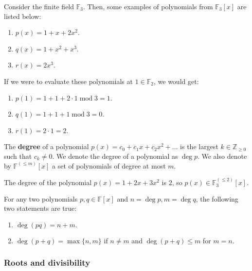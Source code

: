 \documentclass[../lecture-notes.tex]{subfiles}
\begin{document}
\begin{example}
    Consider the finite field $\mathbb{F}_3$. Then, some examples of polynomials from $\mathbb{F}_3[x]$ are listed below:
    \begin{enumerate}
        \item $p(x) = 1 + x + 2x^2$.
        \item $q(x) = 1 + x^2 + x^3$.
        \item $r(x) = 2x^3$.
    \end{enumerate}

   If we were to evaluate these polynomials at $1 \in \mathbb{F}_2$, we would get:
    \begin{enumerate}
        \item $p(1) = 1 + 1 + 2 \cdot 1 \; \text{mod} \; 3 = 1$.
        \item $q(1) = 1 + 1 + 1 \; \text{mod} \; 3 = 0$.
        \item $r(1) = 2 \cdot 1 = 2$.
    \end{enumerate}
\end{example}

\begin{definition}
    The \textbf{degree} of a polynomial $p(x) = c_0+c_1x+c_2x^2+\dots$ is the largest $k \in \mathbb{Z}_{\geq 0}$ such that $c_k \neq 0$. We denote the degree of a polynomial as $\deg p$. We also denote by $\mathbb{F}^{(\leq m)}[x]$ a set of polynomials of degree at most $m$.
\end{definition}

\begin{example}
    The degree of the polynomial $p(x) = 1 + 2x + 3x^2$ is $2$, so $p(x) \in \mathbb{F}_3^{(\leq 2)}[x]$.
\end{example}

\begin{theorem}
    For any two polynomials $p,q \in \mathbb{F}[x]$ and $n = \deg p, m = \deg q$, the following two statements are true:
    \begin{enumerate}
        \item $\deg (pq) = n + m$.
        \item $\deg (p + q) = \max\{n,m\}$ if $n \neq m$ and $\deg (p+q) \leq m$ for $m=n$.
    \end{enumerate}
\end{theorem}

\subsubsection{Roots and divisibility}
\end{document}
